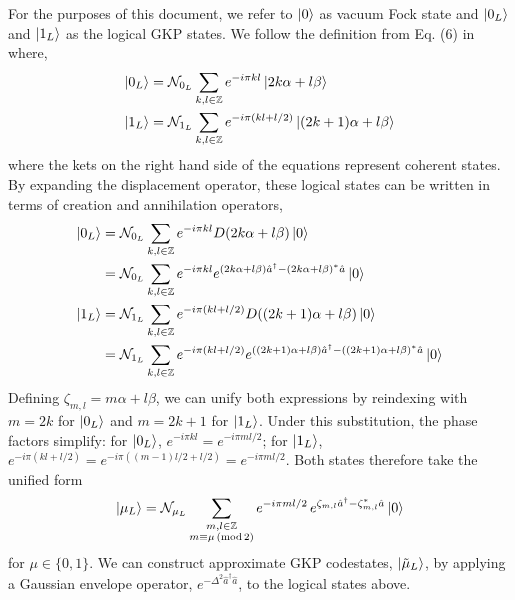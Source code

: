\documentclass[11pt]{article}
\begin{document}
For the purposes of this document, we refer to $\ket{0}$ as vacuum Fock state and $\ket{0_L}$ and $\ket{1_L}$ as the logical GKP states. We follow the definition from Eq. (6) in \cite{grimsmo2021Quantum} where,
\begin{align}
    \ket{0_L} & = \mathcal{N}_{0_L} \sum_{k, l \in \mathbb{Z}} e^{-i \pi k l } \ket{2 k \alpha + l \beta}                \\
    \ket{1_L} & = \mathcal{N}_{1_L} \sum_{k, l \in \mathbb{Z}} e^{-i \pi (k l  + l / 2)} \ket{(2k + 1) \alpha + l \beta}
\end{align}
where the kets on the right hand side of the equations represent coherent states.
By expanding the displacement operator, these logical states can be written in terms of creation and annihilation operators,
\begin{align*}
    \ket{0_L} & = \mathcal{N}_{0_L} \sum_{k, l \in \mathbb{Z}} e^{-i \pi k l } D(2 k \alpha + l \beta) \ket{0}                                                      \\
              & = \mathcal{N}_{0_L} \sum_{k, l \in \mathbb{Z}} e^{-i \pi k l } e^{(2 k \alpha + l \beta)\hat{a}^\dagger - (2 k \alpha + l \beta)^* \hat{a}} \ket{0} \\
    \ket{1_L} & = \mathcal{N}_{1_L} \sum_{k, l \in \mathbb{Z}} e^{-i \pi (k l  + l / 2)} D((2k + 1) \alpha + l \beta) \ket{0}                                       \\
              & = \mathcal{N}_{1_L} \sum_{k, l \in \mathbb{Z}} e^{-i \pi (k l  + l / 2)}
    e^{((2k + 1) \alpha + l \beta)\hat{a}^\dagger - ((2k + 1) \alpha + l \beta)^* \hat{a}} \ket{0}
\end{align*}
Defining $\zeta_{m,l} = m\alpha + l\beta$, we can unify both expressions by reindexing with $m = 2k$ for $\ket{0_L}$ and $m = 2k+1$ for $\ket{1_L}$. Under this substitution, the phase factors simplify: for $\ket{0_L}$, $e^{-i\pi k l} = e^{-i\pi m l / 2}$; for $\ket{1_L}$, $e^{-i\pi(kl + l/2)} = e^{-i\pi((m-1)l/2 + l/2)} = e^{-i\pi m l / 2}$. Both states therefore take the unified form
\begin{equation}
    \ket{\mu_L} = \mathcal{N}_{\mu_L} \sum_{\substack{m, l \in \mathbb{Z} \\ m \equiv \mu \,(\mathrm{mod}\, 2)}} e^{-i \pi m l / 2} \, e^{\zeta_{m,l} \hat{a}^\dagger - \zeta_{m,l}^* \hat{a}} \ket{0}
\end{equation}
for $\mu \in \{0, 1\}$.
We can construct approximate GKP codestates, $\ket{\tilde{\mu}_L}$, by applying a Gaussian envelope operator, $e^{-\Delta^2 \hat{a}^\dagger \hat{a}}$, to the logical states above.
\end{document}

